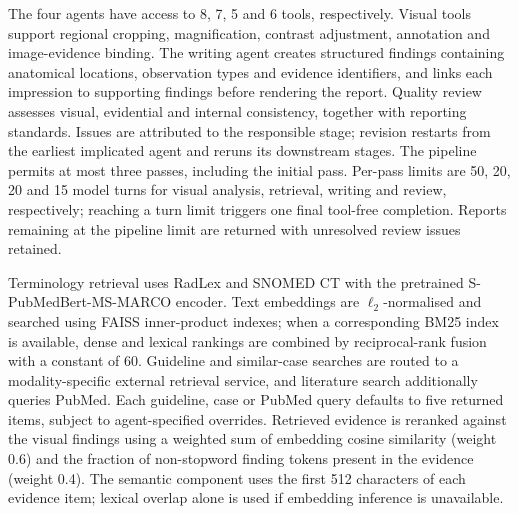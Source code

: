 The four agents have access to 8, 7, 5 and 6 tools, respectively. Visual tools support regional cropping, magnification, contrast adjustment, annotation and image-evidence binding. The writing agent creates structured findings containing anatomical locations, observation types and evidence identifiers, and links each impression to supporting findings before rendering the report. Quality review assesses visual, evidential and internal consistency, together with reporting standards. Issues are attributed to the responsible stage; revision restarts from the earliest implicated agent and reruns its downstream stages. The pipeline permits at most three passes, including the initial pass. Per-pass limits are 50, 20, 20 and 15 model turns for visual analysis, retrieval, writing and review, respectively; reaching a turn limit triggers one final tool-free completion. Reports remaining at the pipeline limit are returned with unresolved review issues retained.

Terminology retrieval uses RadLex and SNOMED CT with the pretrained S-PubMedBert-MS-MARCO encoder. Text embeddings are $\ell_2$-normalised and searched using FAISS inner-product indexes; when a corresponding BM25 index is available, dense and lexical rankings are combined by reciprocal-rank fusion with a constant of 60. Guideline and similar-case searches are routed to a modality-specific external retrieval service, and literature search additionally queries PubMed. Each guideline, case or PubMed query defaults to five returned items, subject to agent-specified overrides. Retrieved evidence is reranked against the visual findings using a weighted sum of embedding cosine similarity (weight 0.6) and the fraction of non-stopword finding tokens present in the evidence (weight 0.4). The semantic component uses the first 512 characters of each evidence item; lexical overlap alone is used if embedding inference is unavailable.

